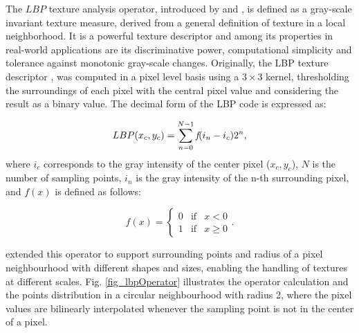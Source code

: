 

The $LBP$ texture analysis operator, introduced by \citep{ojala1996comparative} and \citep{ojala2002multiresolution}, is defined as a gray-scale invariant  texture measure, derived from a general definition of texture in a local neighborhood. It is a powerful texture descriptor and among its properties in real-world applications are its discriminative power, computational simplicity and tolerance against monotonic gray-scale changes. Originally, the LBP texture descriptor \citep{ojala1996comparative}, was computed in a pixel level basis using a $3 \times 3$ kernel, thresholding the surroundings of each pixel with the central pixel value and considering the result as a binary value. The decimal form of the LBP code is expressed as:

\begin{equation}
LBP(x_{c},y_{c})=\displaystyle\sum\limits_{n=0}^{N-1} \emph{f}(i_{n}-i_{c})2^n,
\label{eq:LBP}
\end{equation}
\noindent where $i_{c}$ corresponds to the gray intensity of the center pixel ($x_{c}, y_{c}$), $N$ is the number of sampling points, $i_{n}$ is the gray intensity of the n-th surrounding pixel, and $f(x)$ is defined as follows:

\begin{equation}
f(x)  =
\left\lbrace \begin{array}{ccc}
0 & \mbox{if} & x<0 \\
1 & \mbox{if} & x\geq0 
\end{array}. \right.
\label{eq:fx}
\end{equation}

\cite{ojala2002multiresolution} extended this operator to support surrounding points and radius of a pixel neighbourhood with different shapes and sizes, enabling the handling of textures at different scales. Fig. \ref{fig_lbpOperator} illustrates the operator calculation and the points distribution in a circular neighbourhood with radius 2, where the pixel values are bilinearly interpolated whenever the sampling point is not in the center of a pixel.

